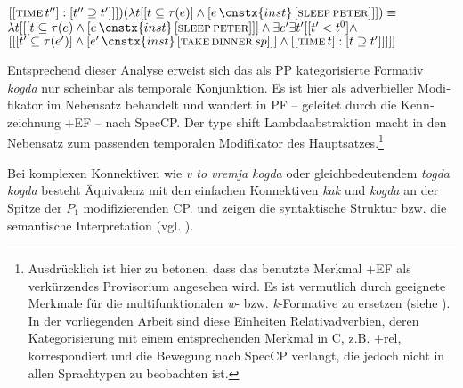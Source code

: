 \documentclass[output=paper, colorlinks, citecolor=brown, booklanguage=german]{langscibook}
\begin{document}
\begin{otherlanguage}{german}
{     $ [[\textsc{time}\, t''] : [t'' \supseteq t']]]) (\lambda t [[t \subseteq \tau (e)] \wedge [e \,\cnstx{inst}\, [\textsc{sleep}\,\textsc{peter}]]]) \equiv$
     \newline
    $\lambda t [[[t \subseteq \tau (e) \wedge [e \,\cnstx{inst}\, [\textsc{sleep}\,\textsc{peter}]]] \wedge \exists e' \exists t' [[t' < t^0] \wedge $
    \newline
    $ [[[t' \subseteq \tau (e')] \wedge [e' \,\cnstx{inst}\, [\textsc{take}\,\textsc{dinner}\, sp]]] \wedge [[\textsc{time}\, t] : [t \supseteq t']]]]]$
    }
    \ex{ \label{ex:18:41d} $\parallel$[\textsubscript{CP} $\varnothing$\textsubscript{$+$C$+$force} ($\parallel$[\textsubscript{ModP} $\varnothing$\textsubscript{Mod}] (TS\textsubscript{LA}($\parallel$[\textsubscript{TP} $\varnothing$\textsubscript{T} \REF{ex:18:41c}]$\parallel$)])$\parallel$)]$\parallel$ $=$
    \newline
    $\cnstx{decl}\,\lambda w \exists e \exists t [[[t < t^0] \wedge [[t \subseteq \tau (e)] \wedge \newline [e \,\cnstx{inst}\, [\textsc{sleep}\,\textsc{peter}]]]] \wedge \exists e' \exists t' [[t' < t^0] \wedge [[t' \subseteq \tau (e')] \wedge \newline [e' \,\cnstx{inst}\, [\textsc{take}\,\textsc{dinner}\, sp]] \wedge [[\textsc{time}\, t] : [t \supseteq t']]]] w]$
    }
	\z
\z

\noindent Entsprechend dieser Analyse erweist sich das als PP kategorisierte Formativ \textit{kog\-da} nur scheinbar als temporale Konjunktion. Es ist hier als adverbieller Modifikator im Nebensatz behandelt und wandert in PF -- geleitet durch die Kennzeichnung +EF -- nach SpecCP. Der type shift Lambdaabstraktion macht in  den Nebensatz zum passenden temporalen Modifikator des Hauptsatzes.\footnote{\label{fn:18:10}Ausdrücklich ist hier zu betonen, dass das benutzte Merkmal +EF als verkürzendes Provisorium angesehen wird. Es ist vermutlich durch geeignete Merkmale für die multifunktionalen \textit{w}- bzw. \textit{k}-Formative zu ersetzen (siehe \citealt{zi18:Zimmermann2000}). In der vorliegenden Arbeit sind diese Einheiten Relativadverbien, deren Kategorisierung mit einem entsprechenden Merkmal in C, z.B. +rel, korrespondiert und die Bewegung nach SpecCP verlangt, die jedoch nicht in allen Sprachtypen zu beobachten ist.}

Bei komplexen Konnektiven wie \textit{v to vremja kogda} oder gleichbedeutendem \textit{togda kogda} besteht Äquivalenz mit den einfachen Konnektiven \textit{kak} und \textit{kogda} an der Spitze der $P_1$ modifizierenden CP.  und  zeigen die syntaktische Struktur bzw. die semantische Interpretation (vgl. ).


\end{otherlanguage}
\end{document}
